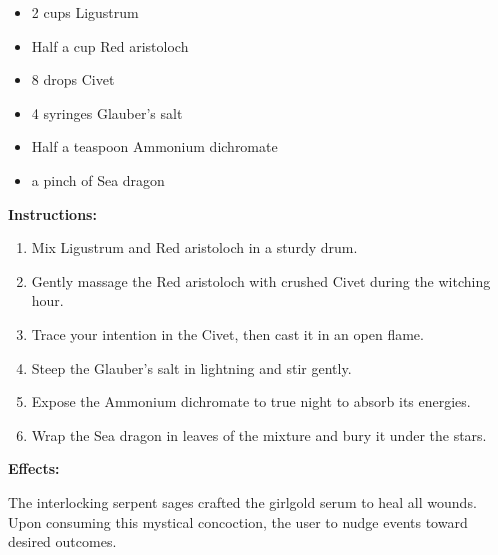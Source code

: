 \documentclass{article}
\begin{document}
\begin{itemize}
  \item 2 cups Ligustrum
  \item Half a cup Red aristoloch
  \item 8 drops Civet
  \item 4 syringes Glauber's salt
  \item Half a teaspoon Ammonium dichromate
  \item a pinch of Sea dragon
\end{itemize}

\textbf{Instructions:}

\begin{enumerate}
  \item Mix Ligustrum and Red aristoloch in a sturdy drum.
  \item Gently massage the Red aristoloch with crushed Civet during the witching hour.
  \item Trace your intention in the Civet, then cast it in an open flame.
  \item Steep the Glauber's salt in lightning and stir gently.
  \item Expose the Ammonium dichromate to true night to absorb its energies.
  \item Wrap the Sea dragon in leaves of the mixture and bury it under the stars.
\end{enumerate}

\textbf{Effects:}

The interlocking serpent sages crafted the girlgold serum to heal all wounds. Upon consuming this mystical concoction, the user to nudge events toward desired outcomes.
\end{document}
